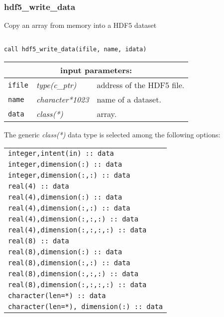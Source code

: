 \subsubsection{hdf5\_write\_data}

Copy an array from memory into a HDF5 dataset

\begin{verbatim}

call hdf5_write_data(ifile, name, idata)
\end{verbatim}

\noindent
\begin{tabular}{|p{1.5cm}|p{3cm}|p{10cm}|}
\hline
\multicolumn{3}{|c|}{\bf input parameters:} \\
\hline
{\tt ifile} & {\it type(c\_ptr)} & address of the HDF5 file. \\
\hline
{\tt name} & {\it character*1023} & name of a dataset. \\
\hline
{\tt data} & {\it class(*)} & array.\\
\hline
\end{tabular}

\vskip 0.5cm
\goodbreak

\noindent The generic {\it class(*)} data type is selected among the following options:

\vskip 0.2cm
\begin{tabular}{|p{8.5cm}|}
\hline
{\tt integer,intent(in) :: data} \\
{\tt integer,dimension(:) :: data} \\
{\tt integer,dimension(:,:) :: data} \\
{\tt real(4) :: data} \\
{\tt real(4),dimension(:) :: data} \\
{\tt real(4),dimension(:,:) :: data} \\
{\tt real(4),dimension(:,:,:) :: data} \\
{\tt real(4),dimension(:,:,:,:) :: data} \\
{\tt real(8) :: data} \\
{\tt real(8),dimension(:) :: data} \\
{\tt real(8),dimension(:,:) :: data} \\
{\tt real(8),dimension(:,:,:) :: data} \\
{\tt real(8),dimension(:,:,:,:) :: data} \\
{\tt character(len=*) :: data} \\
{\tt character(len=*), dimension(:) :: data} \\
\hline
\end{tabular}

